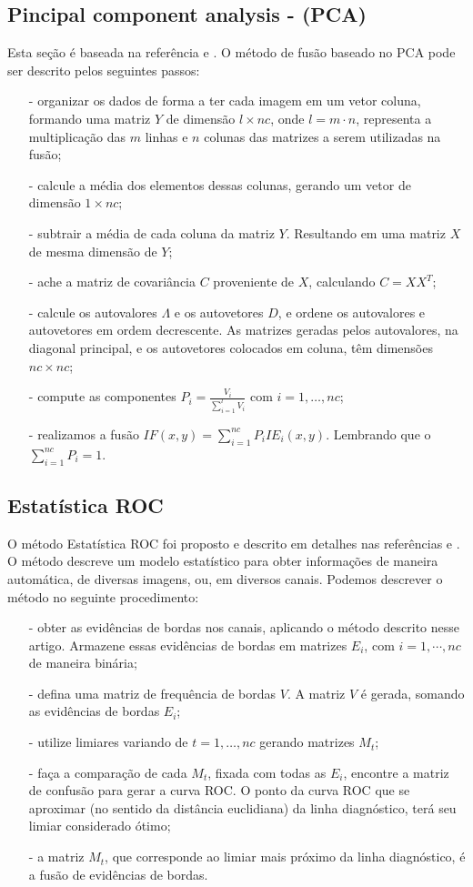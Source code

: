 \documentclass[conference]{IEEEtran}
\begin{document}
\subsection{Pincipal component analysis - (PCA) }
Esta seção é baseada na referência \cite{n_r} e \cite{mit}. O método de fusão baseado no PCA pode ser descrito pelos seguintes passos:
\begin{itemize}
\item[-] organizar os dados de forma a ter cada imagem em um vetor coluna, formando uma matriz $Y$ de dimensão $l\times nc$, onde $l=m\cdot n$, representa a multiplicação das $m$ linhas e $n$ colunas das matrizes a serem utilizadas na fusão;
\item[-] calcule a média dos elementos dessas colunas, gerando um vetor de dimensão $1\times nc$;
\item[-] subtrair a média de cada coluna da matriz $Y$. Resultando em uma matriz $X$ de mesma dimensão de $Y$; 
\item[-] ache a matriz de covariância $C$ proveniente de $X$, calculando $C=XX^T$;
\item[-] calcule os autovalores $\Lambda$ e os autovetores $D$, e ordene os autovalores e autovetores em ordem decrescente. As matrizes geradas pelos autovalores, na diagonal principal, e os autovetores colocados em coluna, têm dimensões $nc\times nc$;
\item[-] compute as componentes $P_i=\frac{V_i}{\sum_{i=1}^l V_i}$ com $i=1,\dots,nc$;
\item[-] realizamos a fusão $IF(x,y)=\sum_{i=1}^{nc}P_iIE_i(x,y)$. Lembrando que o $\sum_{i=1}^{nc}P_i=1$.
\end{itemize}

\subsection{Estatística ROC}
O método Estatística ROC foi proposto e descrito em detalhes nas referências \cite{gs} e \cite{fawcett}. O método descreve um modelo estatístico para obter informações de maneira automática, de diversas imagens, ou, em diversos canais. Podemos descrever o método no seguinte procedimento:
\begin{itemize}
\item[-] obter as evidências de bordas nos canais, aplicando o método descrito nesse artigo. Armazene essas evidências de bordas em matrizes $E_i$, com $i=1,\cdots,nc$ de maneira binária;
\item[-] defina uma matriz de frequência de bordas $V$. A matriz  $V$ é gerada, somando as evidências de bordas $E_i$;
\item[-] utilize limiares variando de $t=1,\dots,nc$ gerando matrizes $M_t$;
\item[-] faça a comparação de cada $M_t$, fixada com todas as $E_i$,  encontre a matriz de confusão para gerar a curva ROC. O ponto da curva ROC que se aproximar (no sentido da distância euclidiana) da linha diagnóstico, terá seu limiar considerado ótimo;
\item[-] a matriz $M_t$, que corresponde ao limiar mais próximo da linha diagnóstico, é a fusão de evidências de bordas.
\end{itemize}
  
\end{document}
